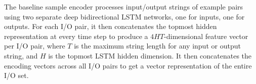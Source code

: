 \documentclass{article}
\begin{document}
The baseline sample encoder processes input/output strings of example pairs
using two separate deep bidirectional LSTM networks,
one for inputs, one for outputs.
For each I/O pair, it then concatenates the topmost hidden representation
at every time step to produce a $4HT$-dimensional feature vector per I/O pair,
where $T$ is the maximum string length for any input or output string,
and $H$ is the topmost LSTM hidden dimension.
It then concatenates the encoding vectors across all I/O pairs
to get a vector representation of the entire I/O set.~\citep{nsps}

\end{document}
